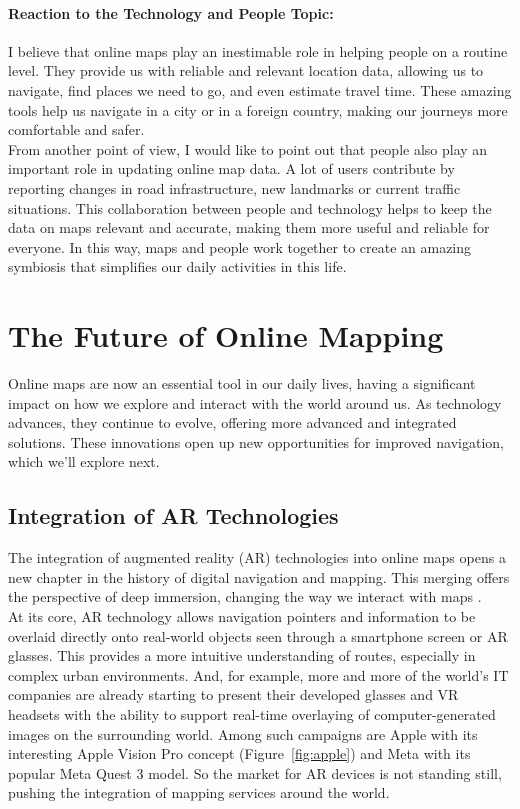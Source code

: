 \documentclass[10pt,oneside,english,a4paper]{article}
\begin{document}
\paragraph{Reaction to the Technology and People Topic:}
I believe that online maps play an inestimable role in helping people on a routine level. They provide us with reliable and relevant location data, allowing us to navigate, find places we need to go, and even estimate travel time. These amazing tools help us navigate in a city or in a foreign country, making our journeys more comfortable and safer.
\\From another point of view, I would like to point out that people also play an important role in updating online map data. A lot of users contribute by reporting changes in road infrastructure, new landmarks or current traffic situations. This collaboration between people and technology helps to keep the data on maps relevant and accurate, making them more useful and reliable for everyone. In this way, maps and people work together to create an amazing symbiosis that simplifies our daily activities in this life. 

\section{The Future of Online Mapping} \label{future}
Online maps are now an essential tool in our daily lives, having a significant impact on how we explore and interact with the world around us. As technology advances, they continue to evolve, offering more advanced and integrated solutions. These innovations open up new opportunities for improved navigation, which we'll explore next.

\subsection{Integration of AR Technologies} \label {future:ar}
The integration of augmented reality (AR) technologies into online maps opens a new chapter in the history of digital navigation and mapping. This merging offers the perspective of deep immersion, changing the way we interact with maps \cite{Bobrich2002}. 
\\At its core, AR technology allows navigation pointers and information to be overlaid directly onto real-world objects seen through a smartphone screen or AR glasses. This provides a more intuitive understanding of routes, especially in complex urban environments. And, for example, more and more of the world's IT companies are already starting to present their developed glasses and VR headsets with the ability to support real-time overlaying of computer-generated images on the surrounding world. Among such campaigns are Apple with its interesting Apple Vision Pro concept (Figure~\ref{fig:apple}) and Meta with its popular Meta Quest 3 model. So the market for AR devices is not standing still, pushing the integration of mapping services around the world.
\end{document}
